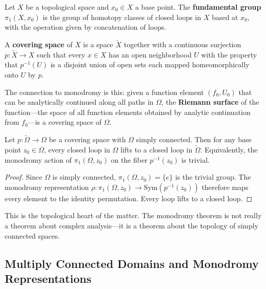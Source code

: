 \begin{definition}
Let $X$ be a topological space and $x_0 \in X$ a base point. The \textbf{fundamental group} $\pi_1(X, x_0)$ is the group of homotopy classes of closed loops in $X$ based at $x_0$, with the operation given by concatenation of loops.
\end{definition}

\begin{definition}
A \textbf{covering space} of $X$ is a space $\tilde{X}$ together with a continuous surjection $p \colon \tilde{X} \to X$ such that every $x \in X$ has an open neighborhood $U$ with the property that $p^{-1}(U)$ is a disjoint union of open sets each mapped homeomorphically onto $U$ by $p$.
\end{definition}

The connection to monodromy is this: given a function element $(f_0, U_0)$ that can be analytically continued along all paths in $\Omega$, the \textbf{Riemann surface} of the function---the space of all function elements obtained by analytic continuation from $f_0$---is a covering space of $\Omega$.

\begin{theorem}
\label{thm:monodromy-topological}
Let $p \colon \tilde{\Omega} \to \Omega$ be a covering space with $\Omega$ simply connected. Then for any base point $z_0 \in \Omega$, every closed loop in $\Omega$ lifts to a closed loop in $\tilde{\Omega}$. Equivalently, the monodromy action of $\pi_1(\Omega, z_0)$ on the fiber $p^{-1}(z_0)$ is trivial.
\end{theorem}

\begin{proof}
Since $\Omega$ is simply connected, $\pi_1(\Omega, z_0) = \{e\}$ is the trivial group. The monodromy representation $\rho \colon \pi_1(\Omega, z_0) \to \mathrm{Sym}(p^{-1}(z_0))$ therefore maps every element to the identity permutation. Every loop lifts to a closed loop.
\end{proof}

This is the topological heart of the matter. The monodromy theorem is not really a theorem about complex analysis---it is a theorem about the topology of simply connected spaces.

\subsection{Multiply Connected Domains and Monodromy Representations}

